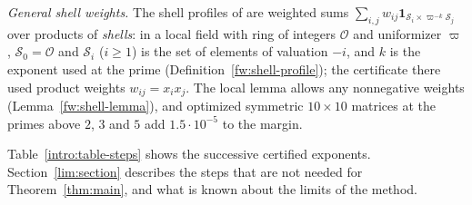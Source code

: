 \emph{General shell weights.} The shell profiles of \cite{Naslund04273}
are weighted sums $\sum_{i,j}w_{ij}\mathbf 1_{\mathcal S_i\times
\varpi^{-k}\mathcal S_j}$ over products of \emph{shells}: in a local field
with ring of integers $\mathcal O$ and uniformizer $\varpi$,
$\mathcal S_0=\mathcal O$ and $\mathcal S_i$ ($i\ge1$) is the set of elements
of valuation $-i$, and $k$ is the exponent used at the prime
(Definition~\ref{fw:shell-profile}); the certificate there
used product weights $w_{ij}=x_ix_j$. The local lemma allows any
nonnegative weights (Lemma~\ref{fw:shell-lemma}), and optimized symmetric
$10\times10$ matrices at the primes above $2$, $3$ and $5$ add
$1.5\cdot10^{-5}$ to the margin.

Table~\ref{intro:table-steps} shows the successive certified exponents.
Section~\ref{lim:section} describes the steps that are not needed for
Theorem~\ref{thm:main}, and what is known about the limits of the
method.

